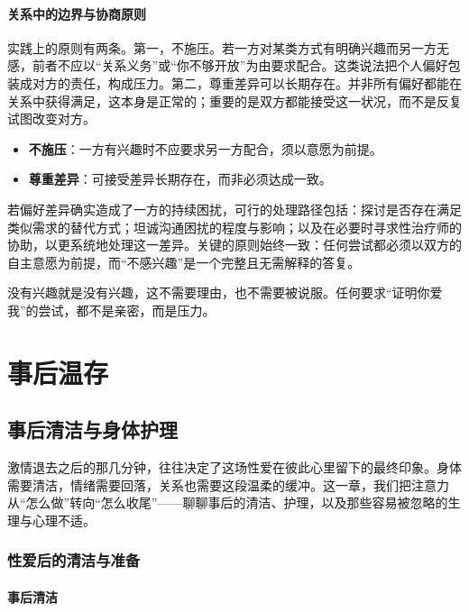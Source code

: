 \documentclass[12pt,UTF8]{ctexbook}
\begin{document}
\subsection{关系中的边界与协商原则}

实践上的原则有两条。第一，不施压。若一方对某类方式有明确兴趣而另一方无感，前者不应以“关系义务”或“你不够开放”为由要求配合。这类说法把个人偏好包装成对方的责任，构成压力。第二，尊重差异可以长期存在。并非所有偏好都能在关系中获得满足，这本身是正常的；重要的是双方都能接受这一状况，而不是反复试图改变对方。

\begin{itemize}
\item \textbf{不施压}：一方有兴趣时不应要求另一方配合，须以意愿为前提。
\item \textbf{尊重差异}：可接受差异长期存在，而非必须达成一致。
\end{itemize}

若偏好差异确实造成了一方的持续困扰，可行的处理路径包括：探讨是否存在满足类似需求的替代方式；坦诚沟通困扰的程度与影响；以及在必要时寻求性治疗师的协助，以更系统地处理这一差异。关键的原则始终一致：任何尝试都必须以双方的自主意愿为前提，而“不感兴趣”是一个完整且无需解释的答复。

\begin{tcolorbox}[colback=pink!5!white,colframe=red!50!black,title=贴心小叮咛]
没有兴趣就是没有兴趣，这不需要理由，也不需要被说服。任何要求“证明你爱我”的尝试，都不是亲密，而是压力。
\end{tcolorbox}

\part{事后温存}

\chapter{事后清洁与身体护理}

激情退去之后的那几分钟，往往决定了这场性爱在彼此心里留下的最终印象。身体需要清洁，情绪需要回落，关系也需要这段温柔的缓冲。这一章，我们把注意力从“怎么做”转向“怎么收尾”——聊聊事后的清洁、护理，以及那些容易被忽略的生理与心理不适。

\section{性爱后的清洁与准备}

\subsection{事后清洁}
\end{document}
